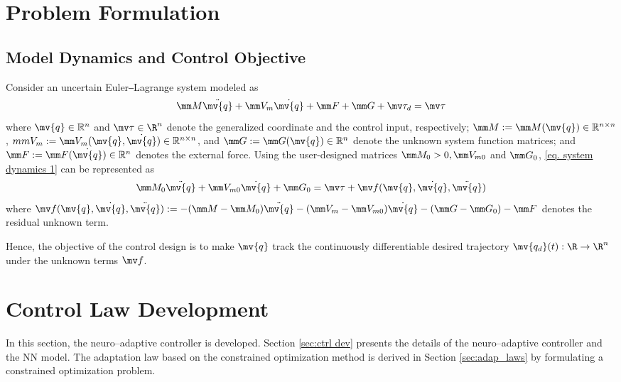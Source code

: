 \documentclass[letterpaper, 10 pt, conference]{ieeeconf}  %
\newcommand*{\q}{\mv{q}}
\newcommand*{\dq}{\dot{\q}}
\newcommand*{\ddq}{\ddot{\q}}
\newcommand*{\qd}{\mv{q_d}}
\begin{document}
\section{Problem Formulation}\label{sec: Problem Formulation}

\subsection{Model Dynamics and Control Objective}

Consider an uncertain Euler‒Lagrange system modeled as
\begin{equation}
    \mm M\ddq + \mm V_m\dq + \mm F + \mm G + \mv\tau_d
    =
    \mv\tau 
    \label{eq. system dynamics 1}
\end{equation}
where $\q\in \mathbb{R}^n$ and $\mv \tau\in\R^n$ denote the generalized coordinate and the control input, respectively; $\mm M :=\mm M(\q)\in\mathbb{R}^{n\times n}$, $mm V_m:= \mm V_m(\q,\dq)\in\mathbb{R}^{n\times n}$, and $\mm G:=\mm G(\q)\in\mathbb{R}^{n}$ denote the unknown system function matrices; and $\mm F:=\mm F(\dq)\in\mathbb{R}^{n}$ denotes the external force.
Using the user-designed matrices $\mm M_0>0,\mm V_{m0}$ and $\mm G_0$, \eqref{eq. system dynamics 1} can be represented as 
\begin{equation}
    \mm M_0\ddq+\mm V_{m0}\dq+\mm G_0 = \mv \tau + \mv f(\q,\dq,\ddq)
    \label{eq. system dynamics 2}
\end{equation}
where $\mv f(\q,\dq,\ddq) := -(\mm M-\mm M_0)\ddq-(\mm V_m-\mm V_{m0})\dq -(\mm G-\mm G_0) -\mm F$ denotes the residual unknown term.

Hence, the objective of the control design is to make $\q$ track the continuously differentiable desired trajectory $\qd(t):\R\to \R^n$ under the unknown terms $\mv f$.

\section{Control Law Development}\label{sec:ctrl design}

In this section, the neuro–adaptive controller is developed.
Section \ref{sec:ctrl dev} presents the details of the neuro–adaptive controller and the NN model.
The adaptation law based on the constrained optimization method is derived in Section \ref{sec:adap_laws} by formulating a constrained optimization problem.
\end{document}
